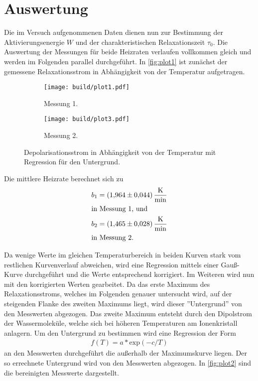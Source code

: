 \section{Auswertung}
\label{sec:Auswertung}

Die im Versuch aufgenommenen Daten dienen nun zur Bestimmung der Aktivierungsenergie $W$ und der charakteristischen Relaxationszeit $\tau_0$.
Die Auswertung der Messungen für beide Heizraten verlaufen vollkommen gleich und werden im Folgenden parallel durchgeführt.
In \autoref{fig:plot1} ist zunächst der gemessene Relaxationsstrom in Abhängigkeit von der Temperatur aufgetragen.

\begin{figure}[H]
  \begin{subfigure}{\textwidth}
  \centering
  \texttt{[image: build/plot1.pdf]}
  \caption{Messung 1.}
  \label{fig:plot1a}
  \end{subfigure}
  \hfill
  \begin{subfigure}{\textwidth}
  \centering
  \texttt{[image: build/plot3.pdf]}
  \caption{Messung 2.}
  \label{fig:plot1b}
  \end{subfigure}
  \caption{Depolarisationsstrom in Abhängigkeit von der Temperatur mit Regression für den Untergrund.}
  \label{fig:plot1}
\end{figure}

Die mittlere Heizrate berechnet sich zu
\begin{align*}
  b_1&= \qty{1.964 \pm 0.044}{\kelvin\per\minute}\\
\intertext{in Messung 1, und}
  b_2 &= \qty{1.465 \pm 0.028}{\kelvin\per\minute}\\
\intertext{in Messung 2.}
\end{align*}

Da wenige Werte im gleichen Temperaturbereich in beiden Kurven stark vom restlichen Kurvenverlauf abweichen, wird eine Regression mittels
einer Gauß-Kurve durchgeführt und die Werte entsprechend korrigiert. Im Weiteren wird nun mit den korrigierten Werten gearbeitet.
Da das erste Maximum des Relaxationsstroms, welches im Folgenden genauer
untersucht wird, auf der steigenden Flanke des zweiten Maximums liegt, wird dieser
”Untergrund” von den Messwerten abgezogen.
Das zweite Maximum entsteht durch den Dipolstrom der Wassermoleküle, welche sich bei höheren Temperaturen am Ionenkristall anlagern.
Um den Untergrund zu bestimmen wird eine Regression der Form
\begin{align*}
  f(T)= a * \text{exp}(-c/T)
\end{align*}
an den Messwerten durchgeführt die außerhalb der Maximumskurve liegen.
Der so errechnete Untergrund wird von den Messwerten abgezogen.
In \autoref{fig:plot2} sind die bereinigten Messwerte dargestellt.

